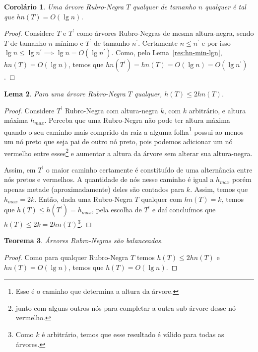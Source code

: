 \documentclass[11pt,twoside]{article}
\newtheorem{theorem}{Teorema}[section]
\newtheorem{lemma}[theorem]{Lema}
\newtheorem{corollary}[theorem]{Corolário}
\theoremstyle{definition}
\begin{document}
\begin{corollary}
	Uma árvore Rubro-Negra \( T \) qualquer de tamanho \( n \) \emph{qualquer} é tal que \( hn(T) = O(\lg n) \).
\end{corollary}
\begin{proof}
	Considere \( T \) e \( T^\prime \) como árvores Rubro-Negras de mesma altura-negra, sendo \( T \) de tamanho \( n \) mínimo e \( T^\prime \) de tamanho \( n^\prime \). Certamente \( n \leq n^\prime \) e por isso \( \lg n \leq \lg n^\prime \implies \lg n = O(\lg n^\prime) \). Como, pelo Lema~\ref{res:hn-min-lgn}, \( hn(T) = O(\lg n) \), temos que \( hn(T^\prime) = hn(T) = O(\lg n) = O(\lg n^\prime) \).
\end{proof}

\begin{lemma}
	Para uma árvore Rubro-Negra \( T \) qualquer, \( h(T) \leq 2 hn(T) \).
\end{lemma}
\begin{proof}
	Considere \( T^\prime \) Rubro-Negra com altura-negra \( k \), com \( k \) arbitrário, e altura máxima \( h_{max} \). Perceba que uma Rubro-Negra não pode ter altura máxima quando o seu caminho mais comprido da raiz a alguma folha\footnote{Esse é o caminho que determina a altura da árvore.} possui ao menos um nó preto que seja pai de outro nó preto, pois podemos adicionar um nó vermelho entre esses\footnote{junto com alguns outros nós para completar a outra sub-árvore desse nó vermelho.} e aumentar a altura da árvore sem alterar sua altura-negra.

	Assim, em \( T^\prime \) o maior caminho certamente é constituído de uma alternância entre nós pretos e vermelhos. A quantidade de nós nesse caminho é igual a \( h_{max} \) porém apenas metade (aproximadamente) deles são contados para \( k \). Assim, temos que \( h_{max} = 2 k \). Então, dada uma Rubro-Negra \( T \) qualquer com \( hn(T) = k \), temos que \( h(T) \leq h(T^\prime) = h_{max} \), pela escolha de \( T^\prime \) e daí concluímos que \( h(T) \leq 2k = 2hn(T) \)\footnote{Como \( k \) é arbitrário, temos que esse resultado é válido para todas as árvores.}.
\end{proof}

\begin{theorem}
	Árvores Rubro-Negras são balanceadas.
\end{theorem}
\begin{proof}
	Como para qualquer Rubro-Negra \( T \) temos \( h(T) \leq 2 hn(T) \) e \( hn(T) = O(\lg n) \), temos que \( h(T) = O(\lg n) \).
\end{proof}

\printbibliography
\end{document}
